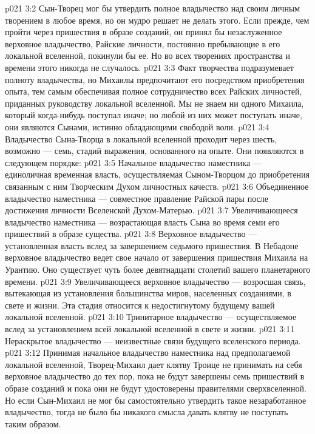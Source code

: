 \vs p021 3:2 \pc Сын\hyp{}Творец мог бы утвердить полное владычество над своим личным творением в любое время, но он мудро решает не делать этого. Если прежде, чем пройти через пришествия в образе созданий, он принял бы незаслуженное верховное владычество, Райские личности, постоянно пребывающие в его локальной вселенной, покинули бы ее. Но во всех творениях пространства и времени этого никогда не случалось.
\vs p021 3:3 Факт творчества подразумевает полноту владычества, но Михаилы предпочитают  его посредством приобретения опыта, тем самым обеспечивая полное сотрудничество всех Райских личностей, приданных руководству локальной вселенной. Мы не знаем ни одного Михаила, который когда\hyp{}нибудь поступал иначе; но любой из них может поступать иначе, они являются Сынами, истинно обладающими свободой воли.
\vs p021 3:4 \pc Владычество Сына\hyp{}Творца в локальной вселенной проходит через шесть, возможно --- семь, стадий выражения, основанного на опыте. Они появляются в следующем порядке:
\vs p021 3:5 \bibnobreakspace Начальное владычество наместника --- единоличная временная власть, осуществляемая Сыном\hyp{}Творцом до приобретения связанным с ним Творческим Духом личностных качеств.
\vs p021 3:6 \pc {}\bibnobreakspace Объединенное владычество наместника --- совместное правление Райской пары после достижения личности Вселенской Духом\hyp{}Матерью.
\vs p021 3:7 \pc {}\bibnobreakspace Увеличивающееся владычество наместника --- возрастающая власть Сына во время семи его пришествий в образе существа.
\vs p021 3:8 \pc {}\bibnobreakspace Верховное владычество --- установленная власть вслед за завершением седьмого пришествия. В Небадоне верховное владычество ведет свое начало от завершения пришествия Михаила на Урантию. Оно существует чуть более девятнадцати столетий вашего планетарного времени.
\vs p021 3:9 \pc {}\bibnobreakspace Увеличивающееся верховное владычество --- возросшая связь, вытекающая из установления большинства миров, населенных созданиями, в свете и жизни. Эта стадия относится к недостигнутому будущему вашей локальной вселенной.
\vs p021 3:10 \pc {}\bibnobreakspace Тринитарное владычество --- осуществляемое вслед за установлением всей локальной вселенной в свете и жизни.
\vs p021 3:11 \pc {}\bibnobreakspace Нераскрытое владычество --- неизвестные связи будущего вселенского периода.
\vs p021 3:12 \pc Принимая начальное владычество наместника над предполагаемой локальной вселенной, Творец\hyp{}Михаил дает клятву Троице не принимать на себя верховное владычество до тех пор, пока не будут завершены семь пришествий в образе созданий и пока они не будут удостоверены правителями сверхвселенной. Но если Сын\hyp{}Михаил не мог бы самостоятельно утвердить такое незаработанное владычество, тогда не было бы никакого смысла давать клятву не поступать таким образом.
